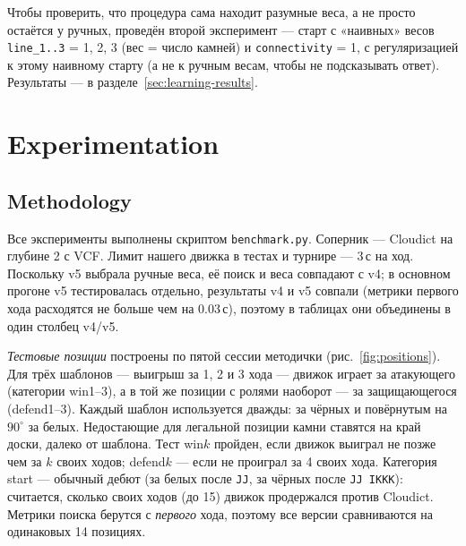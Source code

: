 \documentclass[a4paper,10pt,twocolumn]{article}
\newcommand{\code}[1]{\texttt{#1}}
\begin{document}
Чтобы проверить, что процедура сама находит разумные веса, а не просто остаётся у ручных, проведён второй эксперимент --- старт с «наивных» весов \code{line\_1..3} = 1, 2, 3 (вес = число камней) и \code{connectivity} = 1, с регуляризацией к этому наивному старту (а не к ручным весам, чтобы не подсказывать ответ). Результаты --- в разделе~\ref{sec:learning-results}.

\section{Experimentation}\label{sec:exp}

\subsection{Methodology}
Все эксперименты выполнены скриптом \code{benchmark.py}. Соперник --- Cloudict на глубине 2 с VCF. Лимит нашего движка в тестах и турнире --- 3\,с на ход. Поскольку v5 выбрала ручные веса, её поиск и веса совпадают с v4; в основном прогоне v5 тестировалась отдельно, результаты v4 и v5 совпали (метрики первого хода расходятся не больше чем на 0.03\,с), поэтому в таблицах они объединены в один столбец v4/v5.

\emph{Тестовые позиции} построены по пятой сессии методички (рис.~\ref{fig:positions}). Для трёх шаблонов --- выигрыш за 1, 2 и 3 хода --- движок играет за атакующего (категории win1--3), а в той же позиции с ролями наоборот --- за защищающегося (defend1--3). Каждый шаблон используется дважды: за чёрных и повёрнутым на $90^\circ$ за белых. Недостающие для легальной позиции камни ставятся на край доски, далеко от шаблона. Тест win$k$ пройден, если движок выиграл не позже чем за $k$ своих ходов; defend$k$ --- если не проиграл за 4 своих хода. Категория start --- обычный дебют (за белых после \code{JJ}, за чёрных после \code{JJ IKKK}): считается, сколько своих ходов (до 15) движок продержался против Cloudict. Метрики поиска берутся с \emph{первого} хода, поэтому все версии сравниваются на одинаковых 14 позициях.
\end{document}
